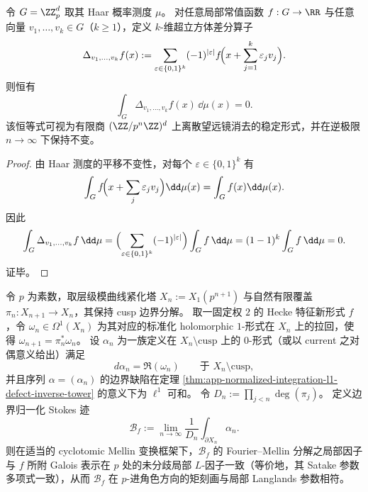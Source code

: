 \begin{proposition}\label{prop:app-padic-hypercube-stokes-haar}
令 \(G=\ZZ_p^{d}\) 取其 Haar 概率测度 \(\mu\)。
对任意局部常值函数 \(f:G\to\RR\) 与任意向量 \(v_1,\dots,v_k\in G\)（\(k\ge 1\)），定义 \(k\)-维超立方体差分算子
\[
\Delta_{v_1,\dots,v_k}f(x)
:=\sum_{\varepsilon\in\{0,1\}^{k}}(-1)^{|\varepsilon|}
f\!\Bigl(x+\sum_{j=1}^{k}\varepsilon_j v_j\Bigr).
\]
则恒有
\[
\int_{G}\Delta_{v_1,\dots,v_k}f(x)\,\dd\mu(x)=0.
\]
该恒等式可视为有限商 \((\ZZ/p^{n}\ZZ)^{d}\) 上离散望远镜消去的稳定形式，并在逆极限 \(n\to\infty\) 下保持不变。
\end{proposition}
\begin{proof}
由 Haar 测度的平移不变性，对每个 \(\varepsilon\in\{0,1\}^k\) 有
\[
\int_G f\!\Bigl(x+\sum_{j}\varepsilon_j v_j\Bigr)\dd\mu(x)=\int_G f(x)\dd\mu(x).
\]
因此
\[
\int_G \Delta_{v_1,\dots,v_k}f\,\dd\mu
=\Bigl(\sum_{\varepsilon\in\{0,1\}^{k}}(-1)^{|\varepsilon|}\Bigr)\int_G f\,\dd\mu
=(1-1)^{k}\int_G f\,\dd\mu=0.
\]
证毕。
\end{proof}

\begin{conjecture}\label{conj:app-modular-curve-tower-stokes-trace-local-factor}
令 \(p\) 为素数，取层级模曲线紧化塔 \(X_n:=X_1(p^{n+1})\) 与自然有限覆盖 \(\pi_n:X_{n+1}\to X_n\)，其保持 cusp 边界分解。
取一固定权 \(2\) 的 Hecke 特征新形式 \(f\)，令 \(\omega_n\in\Omega^1(X_n)\) 为其对应的标准化 holomorphic \(1\)-形式在 \(X_n\) 上的拉回，使得 \(\omega_{n+1}=\pi_n^\ast\omega_n\)。
设 \(\alpha_n\) 为一族定义在 \(X_n\setminus\mathrm{cusp}\) 上的 \(0\)-形式（或以 current 之对偶意义给出）满足
\[
d\alpha_n=\Re(\omega_n)\qquad\text{于 }X_n\setminus\mathrm{cusp},
\]
并且序列 \(\alpha=(\alpha_n)\) 的边界缺陷在定理 \ref{thm:app-normalized-integration-l1-defect-inverse-tower} 的意义下为 \(\ell^1\) 可和。
令 \(D_n:=\prod_{j<n}\deg(\pi_j)\)。
定义边界归一化 Stokes 迹
\[
\mathcal B_f:=\lim_{n\to\infty}\frac{1}{D_n}\int_{\partial X_n}\alpha_n.
\]
则在适当的 cyclotomic Mellin 变换框架下，\(\mathcal B_f\) 的 Fourier--Mellin 分解之局部因子与 \(f\) 所附 Galois 表示在 \(p\) 处的未分歧局部 \(L\)-因子一致（等价地，其 Satake 参数多项式一致），从而 \(\mathcal B_f\) 在 \(p\)-进角色方向的矩刻画与局部 Langlands 参数相符。
\end{conjecture}




